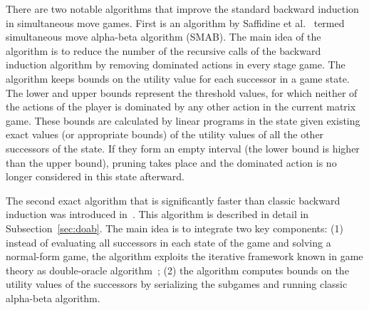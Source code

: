 There are two notable algorithms that improve the standard backward induction in simultaneous move games. 
First is an algorithm by Saffidine et al.~\cite{Saffidine12SMAB} termed simultaneous move alpha-beta algorithm (SMAB). 
The main idea of the algorithm is to reduce the number of the recursive calls of the backward induction
algorithm by removing dominated actions in every stage game. The algorithm keeps bounds on the utility value for each successor in a game state. 
The lower and upper bounds represent the threshold values, for which neither of the actions of the player is dominated by any other action in the current matrix game. These bounds are calculated by linear programs in the state given existing exact values (or appropriate bounds) of the utility values of all the other successors of the state. If they form an empty interval (the lower bound is higher than the upper bound), pruning takes place and the dominated action is no longer considered in this state afterward. 



The second exact algorithm that is significantly faster than classic backward induction was introduced in~\cite{Bosansky13Using}.
This algorithm is described in detail in Subsection~\ref{sec:doab}. The main idea is to integrate two key components: (1) instead of evaluating all successors in each state of the game and solving a normal-form game, the algorithm exploits the iterative framework known in game theory as double-oracle algorithm~\cite{McMahan03Planning}; (2) the algorithm computes bounds on the utility values of the successors by serializing the subgames and running classic alpha-beta algorithm. 

